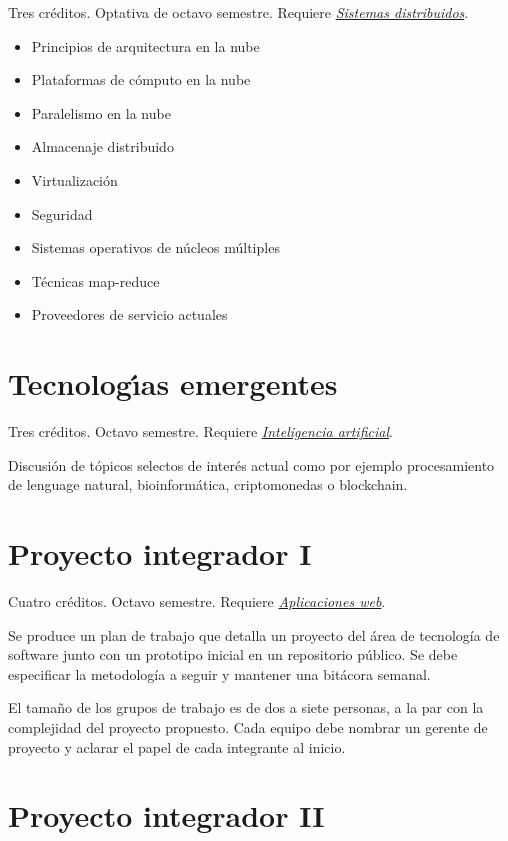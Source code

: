 \documentclass{article}
\begin{document}
\begin{multicols}{4}
Tres cr\'{e}ditos. Optativa de octavo semestre. Requiere
\hyperlink{sdi}{\em Sistemas distribuidos}.

\begin{itemize}
\item{Principios de arquitectura en la nube}
\item{Plataformas de c\'{o}mputo en la nube}
\item{Paralelismo en la nube}
\item{Almacenaje distribuido}
\item{Virtualizaci\'{o}n}
\item{Seguridad}
\item{Sistemas operativos de n\'{u}cleos m\'{u}ltiples}
\item{T\'{e}cnicas map-reduce}
\item{Proveedores de servicio actuales}
\end{itemize}

\end{multicols}
\newpage

\hypertarget{te}{\section*{Tecnolog\'{\i}as emergentes}} 

Tres cr\'{e}ditos. Octavo semestre. Requiere \hyperlink{ia}{\em
  Inteligencia artificial}.

Discusi\'{o}n de t\'{o}picos selectos de inter\'{e}s actual como por ejemplo
procesamiento de lenguage natural, bioinform\'{a}tica, criptomonedas o
blockchain.

\hypertarget{pi1}{\section*{Proyecto integrador I}} 

Cuatro cr\'{e}ditos. Octavo semestre. Requiere \hyperlink{aw}{\em
  Aplicaciones web}.

Se produce un plan de trabajo que detalla un proyecto del \'{a}rea de
tecnolog\'{i}a de software junto con un prototipo inicial en un
repositorio p\'{u}blico. Se debe especificar la metodolog\'{i}a a seguir y
mantener una bit\'{a}cora semanal.

El tama\~{n}o de los grupos de trabajo es de dos a siete personas, a la
par con la complejidad del proyecto propuesto. Cada equipo debe
nombrar un gerente de proyecto y aclarar el papel de cada integrante
al inicio.

\hypertarget{pi2}{\section*{Proyecto integrador II}} 
\end{document}

